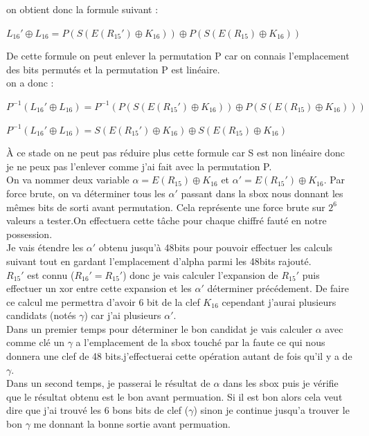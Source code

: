 \documentclass[a4paper]{report}
\begin{document}
			\newpage
			on obtient donc la formule suivant :
			\begin{center}$L_{16}'\oplus L_{16} = P(S(E(R_{15}')\oplus K_{16}))\oplus P(S(E(R_{15})\oplus K_{16})) $\end{center}
			
			De cette formule on peut enlever la permutation P car on connais l'emplacement des bits permutés et la permutation P est linéaire.\\
			on a donc :
			\begin{center}$P^{-1}(L_{16}'\oplus L_{16}) =P^{-1}( P(S(E(R_{15}')\oplus K_{16}))\oplus P(S(E(R_{15})\oplus K_{16}))) $\end{center}
			\begin{center}$P^{-1}(L_{16}'\oplus L_{16}) =S(E(R_{15}')\oplus K_{16})\oplus S(E(R_{15})\oplus K_{16}) $\end{center}
			
			À ce stade on ne peut pas réduire plus cette formule car S est non linéaire donc je ne peux pas l'enlever comme j'ai fait avec la permutation P.\\
			On va nommer deux variable $\alpha = E(R_{15})\oplus K_{16}$ et $\alpha' = E(R_{15}')\oplus K_{16}$.
			Par force brute, on va déterminer tous les $\alpha'$ passant dans la sbox nous donnant les mêmes bits de sorti avant permutation. Cela représente une force brute sur $2^{6}$valeurs a tester.On effectuera cette tâche pour chaque chiffré fauté en notre possession.\\
			Je vais étendre les $\alpha'$ obtenu jusqu'à 48bits pour pouvoir effectuer les calculs suivant tout en gardant l'emplacement d'alpha parmi les 48bits rajouté.\\
			$R_{15}'$ est connu ($R_{16}'=R_{15}'$) donc je vais calculer l'expansion de $R_{15}'$ puis effectuer un xor entre cette expansion et les $\alpha'$ déterminer précédement. De faire ce calcul me permettra d'avoir 6 bit de la clef $K_{16}$ cependant j'aurai plusieurs candidats (notés $\gamma$) car j'ai plusieurs $\alpha'$.\\
			Dans un premier temps pour déterminer le bon candidat je vais calculer $\alpha$ avec comme clé un $\gamma$ a l'emplacement de la sbox touché par la faute ce qui nous donnera une clef de 48 bits.j'effectuerai cette opération autant de fois qu'il y a de $\gamma$.\\
			Dans un second temps, je passerai le résultat de $\alpha$ dans les sbox puis je vérifie que le résultat obtenu est le bon avant permuation. Si il est bon alors cela veut dire que j'ai trouvé les 6 bons bits de clef ($\gamma$) sinon je continue jusqu'a trouver le bon $\gamma$ me donnant la bonne sortie avant permuation.\\
			
\end{document}
